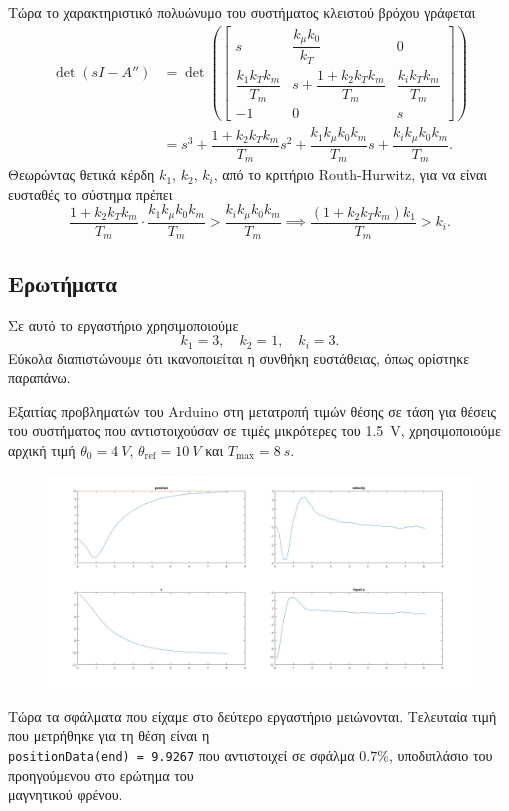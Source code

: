 \documentclass[12pt]{article}
\begin{document}
Τώρα το χαρακτηριστικό πολυώνυμο του συστήματος κλειστού βρόχου γράφεται
\begin{align*}
    \det(sI - A'') &= \det\left(  \begin{bmatrix}
        s & \dfrac{k_\mu k_0}{k_T } & 0 \\
        \dfrac{k_ 1 k_T k_m }{T_m } & s + \dfrac{1 + k_2 k_T k_m}{T_m} & \dfrac{k_i k_T k_m }{T_m } \\
        -1 & 0 & s
\end{bmatrix}\right) \\
    &= s^3 + \dfrac{1 + k_2 k_T k_m}{T_m} s^2 + \dfrac{k_1 k_\mu k_0 k_m }{T_m } s + \dfrac{k_i k_\mu k_0 k_m }{T_m }.
\end{align*} 
Θεωρώντας θετικά κέρδη \(k_1\), \(k_2\), \(k_i \), από το κριτήριο Routh-Hurwitz, για να είναι ευσταθές το σύστημα πρέπει 
\begin{equation*}
    \dfrac{1 + k_2 k_T k_m}{T_m} \cdot \dfrac{k_1 k_\mu k_0 k_m }{T_m } > \dfrac{k_i k_\mu k_0 k_m }{T_m } \implies 
    \dfrac{(1 + k_2 k_T k_m) k_1 }{T_m} > k_i.
\end{equation*} 

\subsection*{Ερωτήματα}
Σε αυτό το εργαστήριο χρησιμοποιούμε
\begin{equation*}
    k_1 = 3, \quad k_2 = 1, \quad k_i = 3.
\end{equation*}
Εύκολα διαπιστώνουμε ότι ικανοποιείται η συνθήκη ευστάθειας, όπως ορίστηκε παραπάνω. 

Εξαιτίας προβληματών του Arduino στη μετατροπή τιμών θέσης σε τάση για θέσεις του συστήματος που αντιστοιχούσαν σε τιμές μικρότερες του \SI{1.5}{V}, χρησιμοποιούμε αρχική τιμή \(\theta_0 = \SI{4}{V }\), \(\theta_\text{ref} = \SI{10}{V }\) και \(T_\text{max} = \SI{8}{s }\). 
\begin{figure}[H]
    \centering
    \includegraphics*[scale=0.25]{lab3_all_lay22.jpg}
\end{figure}
Τώρα τα σφάλματα που είχαμε στο δεύτερο εργαστήριο μειώνονται. Τελευταία τιμή που μετρήθηκε για τη θέση είναι η \\\texttt{positionData(end) = 9.9267} που αντιστοιχεί σε σφάλμα \(0.7\%\), υποδιπλάσιο του προηγούμενου στο ερώτημα του \\ μαγνητικού φρένου. 
\end{document}
